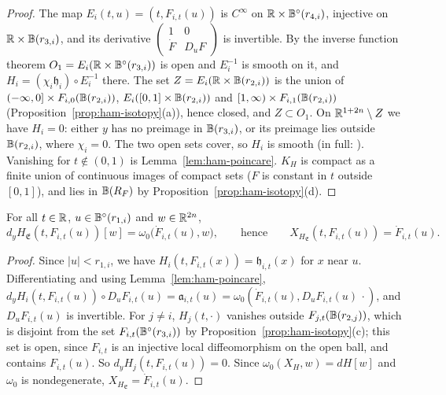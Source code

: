 \begin{proof}
The map $E_i(t,u)=(t,F_{i,t}(u))$ is $C^\infty$ on $\mathbb{R}\times\mathbb{B}^\circ(r_{4,i})$, injective on $\mathbb{R}\times\mathbb{B}(r_{3,i})$,
and its derivative $\left(\begin{smallmatrix}1&0\\\dot F&D_uF\end{smallmatrix}\right)$ is invertible. By the inverse function
theorem $O_1=E_i(\mathbb{R}\times\mathbb{B}^\circ(r_{3,i}))$ is open and $E_i^{-1}$ is smooth on it, and
$H_i=(\chi_i\mathfrak h_i)\circ E_i^{-1}$ there. The set $Z=E_i(\mathbb{R}\times\mathbb{B}(r_{2,i}))$ is the union of
$(-\infty,0]\times F_{i,0}(\mathbb{B}(r_{2,i}))$, $E_i([0,1]\times\mathbb{B}(r_{2,i}))$ and $[1,\infty)\times F_{i,1}(\mathbb{B}(r_{2,i}))$
(Proposition~\ref{prop:ham-isotopy}(a)), hence closed, and $Z\subset O_1$. On $\mathbb{R}^{1+2n}\setminus Z$ we have $H_i=0$:
either $y$ has no preimage in $\mathbb{B}(r_{3,i})$, or its preimage lies outside $\mathbb{B}(r_{2,i})$, where $\chi_i=0$. The two
open sets cover, so $H_i$ is smooth (in full: ). Vanishing for $t\notin(0,1)$ is
Lemma~\ref{lem:ham-poincare}. $K_H$ is compact as a finite union of continuous images of compact sets ($F$ is constant in
$t$ outside $[0,1]$), and lies in $\mathbb{B}(R_F)$ by Proposition~\ref{prop:ham-isotopy}(d).
\end{proof}

\begin{lemma}\label{lem:ham-field}
For all $t\in\mathbb{R}$, $u\in\mathbb{B}^\circ(r_{1,i})$ and $w\in\mathbb{R}^{2n}$,
\[
 d_yH_{\mathfrak E}(t,F_{i,t}(u))[w]=\omega_0\big(\dot F_{i,t}(u),w\big),\qquad\text{hence}\qquad
 X_{H_{\mathfrak E}}(t,F_{i,t}(u))=\dot F_{i,t}(u).
\]
\end{lemma}

\begin{proof}
Since $|u|<r_{1,i}$, we have $H_i(t,F_{i,t}(x))=\mathfrak h_{i,t}(x)$ for $x$ near $u$. Differentiating and using
Lemma~\ref{lem:ham-poincare}, $d_yH_i(t,F_{i,t}(u))\circ D_uF_{i,t}(u)=\mathfrak a_{i,t}(u)=\omega_0(\dot F_{i,t}(u),D_uF_{i,t}(u)\,\cdot)$,
and $D_uF_{i,t}(u)$ is invertible. For $j\ne i$, $H_j(t,\cdot)$ vanishes outside $F_{j,t}(\mathbb{B}(r_{2,j}))$, which is disjoint from
the set $F_{i,t}(\mathbb{B}^\circ(r_{3,i}))$ by Proposition~\ref{prop:ham-isotopy}(c); this set is open, since $F_{i,t}$ is an injective
local diffeomorphism on the open ball, and contains $F_{i,t}(u)$. So $d_yH_j(t,F_{i,t}(u))=0$. Since $\omega_0(X_H,w)=dH[w]$
and $\omega_0$ is nondegenerate, $X_{H_{\mathfrak E}}=\dot F_{i,t}(u)$.
\end{proof}

